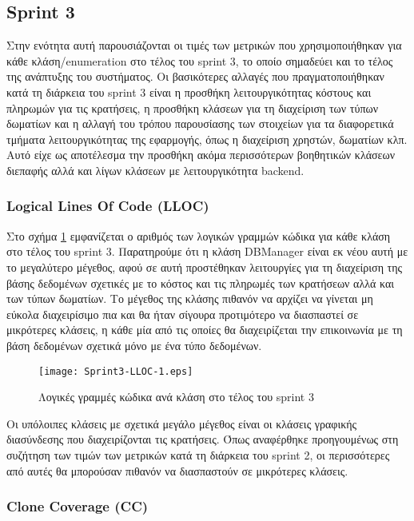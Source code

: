 \subsection{Sprint 3}

Στην ενότητα αυτή παρουσιάζονται οι τιμές των μετρικών που
χρησιμοποιήθηκαν για κάθε κλάση/enumeration στο τέλος του sprint 3, το
οποίο σημαδεύει και το τέλος της ανάπτυξης του συστήματος. Οι
βασικότερες αλλαγές που πραγματοποιήθηκαν κατά τη διάρκεια του sprint 3
είναι η προσθήκη λειτουργικότητας κόστους και πληρωμών για τις
κρατήσεις, η προσθήκη κλάσεων για τη διαχείριση των τύπων δωματίων
και η αλλαγή του τρόπου παρουσίασης των στοιχείων για τα διαφορετικά
τμήματα λειτουργικότητας της εφαρμογής, όπως η διαχείριση χρηστών,
δωματίων κλπ. Αυτό είχε ως αποτέλεσμα την προσθήκη ακόμα περισσότερων
βοηθητικών κλάσεων διεπαφής αλλά και λίγων κλάσεων με λειτουργικότητα
backend.

\subsubsection{Logical Lines Of Code (LLOC)}
\label{section:sprint3LLOC}

Στο σχήμα \ref{fig:sprint3LLOC} εμφανίζεται ο αριθμός των λογικών
γραμμών κώδικα για κάθε κλάση στο τέλος του sprint 3. Παρατηρούμε ότι η
κλάση DBManager είναι εκ νέου αυτή με το μεγαλύτερο μέγεθος, αφού σε
αυτή προστέθηκαν λειτουργίες για τη διαχείριση της βάσης δεδομένων
σχετικές με το κόστος και τις πληρωμές των κρατήσεων αλλά και των τύπων
δωματίων. Το μέγεθος της κλάσης πιθανόν να αρχίζει να γίνεται μη
εύκολα διαχειρίσιμο πια και θα ήταν σίγουρα προτιμότερο να διασπαστεί σε
μικρότερες κλάσεις, η κάθε μία από τις οποίες θα διαχειρίζεται την
επικοινωνία με τη βάση δεδομένων σχετικά μόνο με ένα τύπο δεδομένων.

\begin{figure}
\centering
\texttt{[image: Sprint3-LLOC-1.eps]}
\caption{Λογικές γραμμές κώδικα ανά κλάση στο τέλος του sprint 3}
\label{fig:sprint3LLOC}
\end{figure}

Οι υπόλοιπες κλάσεις με σχετικά μεγάλο μέγεθος είναι οι κλάσεις γραφικής
διασύνδεσης που διαχειρίζονται τις κρατήσεις. Όπως αναφέρθηκε
προηγουμένως στη συζήτηση των τιμών των μετρικών κατά τη διάρκεια του
sprint 2, οι περισσότερες από αυτές θα μπορούσαν πιθανόν να διασπαστούν
σε μικρότερες κλάσεις.

\subsubsection{Clone Coverage (CC)}
\label{section:sprint3CC}

